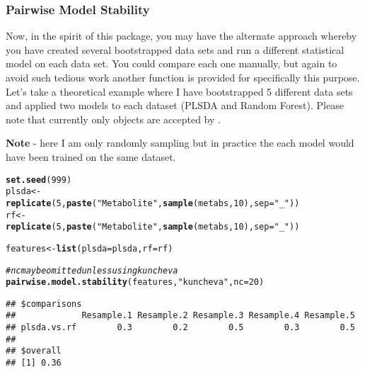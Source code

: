 \documentclass[12pt]{article}\usepackage[]{graphicx}\usepackage[usenames,dvipsnames]{color}
\makeatletter
\newcommand{\hlnum}[1]{\textcolor[rgb]{0.686,0.059,0.569}{#1}}%
\newcommand{\hlstr}[1]{\textcolor[rgb]{0.192,0.494,0.8}{#1}}%
\newcommand{\hlcom}[1]{\textcolor[rgb]{0.678,0.584,0.686}{\textit{#1}}}%
\newcommand{\hlstd}[1]{\textcolor[rgb]{0.345,0.345,0.345}{#1}}%
\newcommand{\hlkwb}[1]{\textcolor[rgb]{0.69,0.353,0.396}{#1}}%
\newcommand{\hlkwc}[1]{\textcolor[rgb]{0.333,0.667,0.333}{#1}}%
\newcommand{\hlkwd}[1]{\textcolor[rgb]{0.737,0.353,0.396}{\textbf{#1}}}%
\newenvironment{kframe}{%
 \def\at@end@of@kframe{}%
 \ifinner\ifhmode%
  \def\at@end@of@kframe{\end{minipage}}%
  \begin{minipage}{\columnwidth}%
 \fi\fi%
 \def\FrameCommand##1{\hskip\@totalleftmargin \hskip-\fboxsep
 \colorbox{shadecolor}{##1}\hskip-\fboxsep
     \hskip-\linewidth \hskip-\@totalleftmargin \hskip\columnwidth}%
 \MakeFramed {\advance\hsize-\width
   \@totalleftmargin\z@ \linewidth\hsize
   \@setminipage}}%
 {\par\unskip\endMakeFramed%
 \at@end@of@kframe}
\newenvironment{knitrout}{}{} %
\makeatother
\begin{document}
\newpage
\subsubsection{Pairwise Model Stability}

Now, in the spirit of this package, you may have the alternate approach whereby
you have created several bootstrapped data sets and run a different statistical
model on each data set.  You could compare each one manually, but again to 
avoid such tedious work another function is provided for specifically this
purpose.  Let's take a theoretical example where I have bootstrapped 5 different
data sets and applied two models to each dataset (PLSDA and Random Forest).
Please note that currently only  objects are accepted by
.

\textbf{Note} - here I am only randomly sampling but in practice the each model
would have been trained on the same dataset. 

\begin{knitrout}
\color{fgcolor}\begin{kframe}
\begin{alltt}
\hlkwd{set.seed}\hlstd{(}\hlnum{999}\hlstd{)}
\hlstd{plsda} \hlkwb{<-}
    \hlkwd{replicate}\hlstd{(}\hlnum{5}\hlstd{,} \hlkwd{paste}\hlstd{(}\hlstr{"Metabolite"}\hlstd{,} \hlkwd{sample}\hlstd{(metabs,} \hlnum{10}\hlstd{),} \hlkwc{sep}\hlstd{=}\hlstr{"_"}\hlstd{))}
\hlstd{rf} \hlkwb{<-}
    \hlkwd{replicate}\hlstd{(}\hlnum{5}\hlstd{,} \hlkwd{paste}\hlstd{(}\hlstr{"Metabolite"}\hlstd{,} \hlkwd{sample}\hlstd{(metabs,} \hlnum{10}\hlstd{),} \hlkwc{sep}\hlstd{=}\hlstr{"_"}\hlstd{))}

\hlstd{features} \hlkwb{<-} \hlkwd{list}\hlstd{(}\hlkwc{plsda}\hlstd{=plsda,} \hlkwc{rf}\hlstd{=rf)}

\hlcom{# nc may be omitted unless using kuncheva}
\hlkwd{pairwise.model.stability}\hlstd{(features,} \hlstr{"kuncheva"}\hlstd{,} \hlkwc{nc}\hlstd{=}\hlnum{20}\hlstd{)}
\end{alltt}
\begin{verbatim}
## $comparisons
##             Resample.1 Resample.2 Resample.3 Resample.4 Resample.5
## plsda.vs.rf        0.3        0.2        0.5        0.3        0.5
## 
## $overall
## [1] 0.36
\end{verbatim}
\end{kframe}
\end{knitrout}

\newpage
\end{document}
